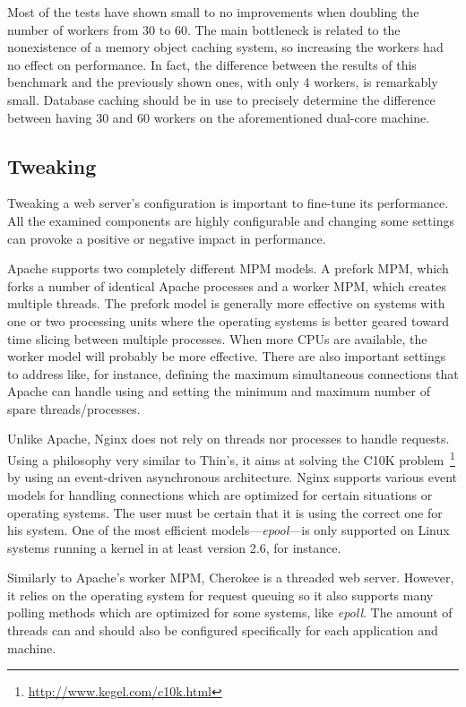 Most of the tests have shown small to no improvements when doubling the number of workers from 30 to 60. The main bottleneck is related to the nonexistence of a memory object caching system, so increasing the workers had no effect on performance. In fact, the difference between the results of this benchmark and the previously shown ones, with only 4 workers, is remarkably small. Database caching should be in use to precisely determine the difference between having 30 and 60 workers on the aforementioned dual-core machine.

\subsection{Tweaking}
Tweaking a web server's configuration is important to fine-tune its performance. All the examined components are highly configurable and changing some settings can provoke a positive or negative impact in performance.

Apache supports two completely different MPM models. A prefork MPM, which forks a number of identical Apache processes and a worker MPM, which creates multiple threads. The prefork model is generally more effective on systems with one or two processing units where the operating systems is better geared toward time slicing between multiple processes. When more CPUs are available, the worker model will probably be more effective. There are also important settings to address like, for instance, defining the maximum simultaneous connections that Apache can handle using  and setting the minimum and maximum number of spare threads/processes.

Unlike Apache, Nginx does not rely on threads nor processes to handle requests. Using a philosophy very similar to Thin's, it aims at solving the C10K problem~\footnote{\url{http://www.kegel.com/c10k.html}} by using an event-driven asynchronous architecture. Nginx supports various event models for handling connections which are optimized for certain situations or operating systems. The user must be certain that it is using the correct one for his system. One of the most efficient models---\textit{epool}---is only supported on Linux systems running a kernel in at least version 2.6, for instance.

Similarly to Apache's worker MPM, Cherokee is a threaded web server. However, it relies on the operating system for request queuing so it also supports many polling methods which are optimized for some systems, like \textit{epoll}. The amount of threads can and should also be configured specifically for each application and machine.

